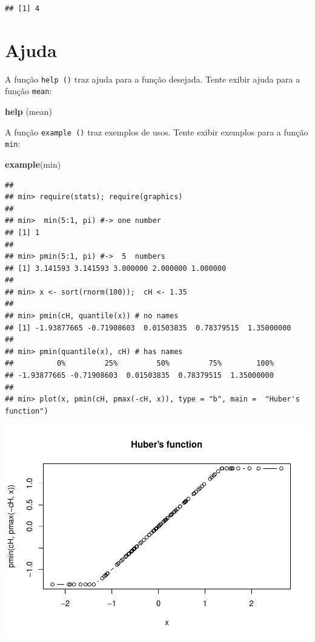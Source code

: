 \documentclass[]{book}
\newenvironment{Shaded}{\begin{snugshade}}{\end{snugshade}}
\newcommand{\KeywordTok}[1]{\textcolor[rgb]{0.13,0.29,0.53}{\textbf{#1}}}
\newcommand{\NormalTok}[1]{#1}
\begin{document}
\begin{verbatim}
## [1] 4
\end{verbatim}

\hypertarget{ajuda}{%
\section{Ajuda}\label{ajuda}}

A função \texttt{help\ ()} traz ajuda para a função desejada. Tente exibir ajuda para a função \texttt{mean}:

\begin{Shaded}
\begin{Highlighting}[]
\KeywordTok{help}\NormalTok{ (mean)}
\end{Highlighting}
\end{Shaded}

A função \texttt{example\ ()} traz exemplos de usos. Tente exibir exemplos para a função \texttt{min}:

\begin{Shaded}
\begin{Highlighting}[]
\KeywordTok{example}\NormalTok{(min)}
\end{Highlighting}
\end{Shaded}

\begin{verbatim}
## 
## min> require(stats); require(graphics)
## 
## min>  min(5:1, pi) #-> one number
## [1] 1
## 
## min> pmin(5:1, pi) #->  5  numbers
## [1] 3.141593 3.141593 3.000000 2.000000 1.000000
## 
## min> x <- sort(rnorm(100));  cH <- 1.35
## 
## min> pmin(cH, quantile(x)) # no names
## [1] -1.93877665 -0.71908603  0.01503835  0.78379515  1.35000000
## 
## min> pmin(quantile(x), cH) # has names
##          0%         25%         50%         75%        100% 
## -1.93877665 -0.71908603  0.01503835  0.78379515  1.35000000 
## 
## min> plot(x, pmin(cH, pmax(-cH, x)), type = "b", main =  "Huber's function")
\end{verbatim}

\includegraphics{TudodoR_files/figure-latex/unnamed-chunk-14-1.pdf}
\end{document}
